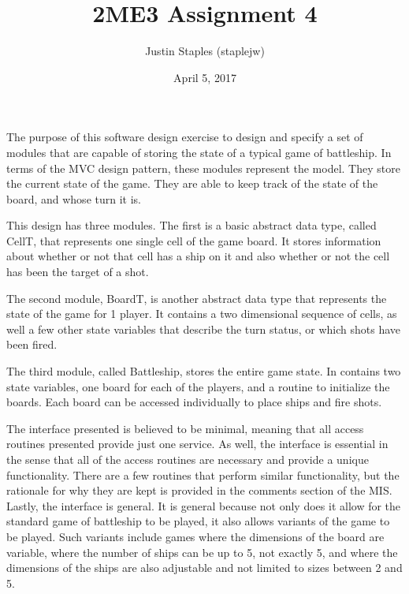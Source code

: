 \documentclass[12pt]{article}
\title{2ME3 Assignment 4}
\author{Justin Staples (staplejw)}
\date{April 5, 2017}
\begin{document}
\maketitle
\thispagestyle{empty}

\newpage

\tableofcontents

\thispagestyle{empty}

\newpage

\setcounter{page}{1}

The purpose of this software design exercise to design and specify a set of modules that are capable of storing the state of a typical game of battleship. In terms of the MVC design pattern, these modules represent the model. They store the current state of the game. They are able to keep track of the state of the board, and whose turn it is. 

This design has three modules. The first is a basic abstract data type, called CellT, that represents one single cell of the game board. It stores information about whether or not that cell has a ship on it and also whether or not the cell has been the target of a shot.

The second module, BoardT, is another abstract data type that represents the state of the game for 1 player. It contains a two dimensional sequence of cells, as well a few other state variables that describe the turn status, or which shots have been fired. 

The third module, called Battleship, stores the entire game state. In contains two state variables, one board for each of the players, and a routine to initialize the boards. Each board can be accessed individually to place ships and fire shots. 

The interface presented is believed to be minimal, meaning that all access routines presented provide just one service. As well, the interface is essential in the sense that all of the access routines are necessary and provide a unique functionality. There are a few routines that perform similar functionality, but the rationale for why they are kept is provided in the comments section of the MIS. Lastly, the interface is general. It is general because not only does it allow for the standard game of battleship to be played, it also allows variants of the game to be played. Such variants include games where the dimensions of the board are variable, where the number of ships can be up to 5, not exactly 5, and where the dimensions of the ships are also adjustable and not limited to sizes between 2 and 5. 
\end{document}
